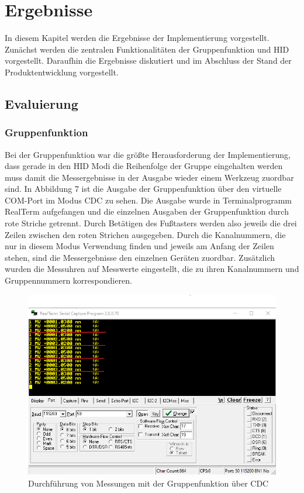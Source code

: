 \section{Ergebnisse}
In diesem Kapitel werden die Ergebnisse der Implementierung vorgestellt. Zunächst werden die zentralen Funktionalitäten der Gruppenfunktion und HID vorgestellt. Daraufhin die Ergebnisse diskutiert und im Abschluss der Stand der Produktentwicklung vorgestellt.

\subsection{Evaluierung}


\subsubsection{Gruppenfunktion}
Bei der Gruppenfunktion war die größte Herausforderung der Implementierung, dass gerade in den HID Modi die Reihenfolge der Gruppe eingehalten werden muss damit die Messergebnisse in der Ausgabe wieder einem Werkzeug zuordbar sind. In Abbildung 7 ist die Ausgabe der Gruppenfunktion über den virtuelle COM-Port im Modus CDC zu sehen. Die Ausgabe wurde in Terminalprogramm RealTerm aufgefangen und die einzelnen Ausgaben der Gruppenfunktion durch rote Striche getrennt. Durch Betätigen des Fußtasters werden also jeweils die drei Zeilen zwischen den roten Strichen ausgegeben. Durch die Kanalnummern, die nur in diesem Modus Verwendung finden und jeweils am Anfang der Zeilen stehen, sind die Messergebnisse den einzelnen Geräten zuordbar. Zusätzlich wurden die Messuhren auf Messwerte eingestellt, die zu ihren Kanalnummern und Gruppennummern korrespondieren. 
\begin{figure}[H] 
	\centering
	\includegraphics[width=\textwidth]{figures/GroupFeature.png}
	\caption{Durchführung von Messungen mit der Gruppenfunktion über CDC}
\end{figure}

